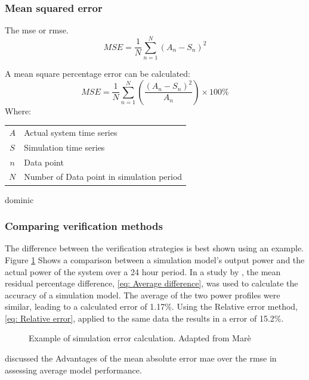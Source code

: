  		\subsubsection{Mean squared error}
 		The \gls{mse} or \gls{rmse}.
 			\begin{equation}
 				\label{eq: rmse}
 				MSE = \dfrac{1}{N}\sum_{n=1}^{N}{(A_{n} - S_{n})^2}
 			\end{equation}
 			\par A mean square percentage error can be calculated:
 			\begin{equation}
 			\label{eq: rmse percent}
 			MSE = \dfrac{1}{N}\sum_{n=1}^{N}{ \left( \dfrac{ (A_{n} - S_{n})^2 }{A_n} \right) } \times 100 \%
 			\end{equation}
 			Where: \par
 			\begin{table}[h!]
 				\centering
 				\begin{tabular}{cl}
 					$A$ & Actual system time series \\
 					$S$ & Simulation time series \\
 					$n$ & Data point \\
 					$N$ & Number of Data point in simulation period \\
 			\end{tabular} 
 			\end{table}
 		\par
 		dominic \cite{dominic2014dynamic}	
 		\subsubsection{Comparing verification methods}
 		The difference between the verification strategies is best shown using an example. Figure \cref{fig:Philipp Difference verify} Shows a comparison between a simulation model's output power and the actual power of the system over a 24 hour period. In a study by \cite{Mare2016PhD}, the mean residual percentage difference, \cref{eq: Average difference}, was used to calculate the accuracy of a simulation model. The average of the two power profiles were similar, leading to a calculated error of 1.17\%. Using the Relative error method, \cref{eq: Relative error}, applied to the same data the results in a error of 15.2\%. 
 		
 	\begin{figure}[h!]
 		\centering
 		
 		\caption[Example of simulation error calculation.]{Example of simulation error calculation. Adapted from Marè \cite{Mare2016PhD}}
 		\label{fig:Philipp Difference verify}
 	\end{figure}
 	\par 
 	\cite{willmott2005advantages} discussed the Advantages of the mean absolute error \gls{mae} over the \gls{rmse} in assessing average model performance.

